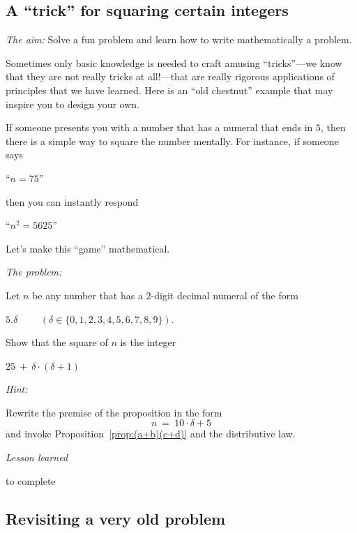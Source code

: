 

\subsection{A ``trick'' for squaring certain integers}

\noindent \textit{The aim:}
Solve a fun problem and learn how to write mathematically a problem.

Sometimes only basic knowledge is needed to craft amusing
``tricks''---we know that they are not really tricks at all!---that
are really rigorous applications of principles that we have learned.
Here is an ``old chestnut'' example that may inspire you to design
your own. 

If someone presents you with a number that has a numeral that ends in
$5$, then there is a simple way to square the number mentally.  For
instance, if someone says

\hspace{.25in}``$n = 75$''

\noindent
then you can instantly respond

\hspace{.25in}``$n^2 = 5625$''

\noindent
Let's make this ``game'' mathematical.
\medskip


\noindent \textit{The problem:}

Let $n$ be any number that has a $2$-digit decimal numeral of the form

\hspace{.25in}$5.\delta$ \ \ \ \ $(\delta \in \{ 0,1,2,3,4,5,6,7,8,9\})$.

\noindent
Show that the square of $n$ is the integer

\hspace{.25in}$25 \ + \ \delta \cdot (\delta +1)$
\medskip

\noindent \textit{Hint:}

Rewrite the premise of the proposition in the form
\[ n \ = \ 10 \cdot \delta + 5 \]
and invoke Proposition~\ref{prop:(a+b)(c+d)} and the
distributive law.
\medskip

\noindent \textit{Lesson learned}

{\Denis to complete}

\subsection{Revisiting a very old problem}


